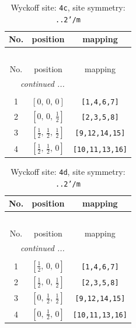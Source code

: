 \documentclass[fleqn,8pt]{jsarticle}
\begin{document}
\renewcommand{\arraystretch}{1.2}
\begin{longtable}{ccc}
\caption{Wyckoff site: {\tt 4c}, site symmetry: {\tt ..2'/m}}
 \\
 \hline \hline
No. & position & mapping \\ \hline \endfirsthead

\multicolumn{2}{l}{\tablename\ \thetable{}} \\
 \hline \hline
No. & position & mapping \\ \hline \endhead

 \hline \hline
\multicolumn{2}{r}{\footnotesize\it continued ...} \\ \endfoot

 \hline \hline
\multicolumn{2}{r}{} \\ \endlastfoot

1 & $\left[ 0,\, 0,\, 0 \right]$ & {\tt [1,4,6,7]} \\ \hline
2 & $\left[ 0,\, 0,\, \frac{1}{2} \right]$ & {\tt [2,3,5,8]} \\ \hline
3 & $\left[ \frac{1}{2},\, \frac{1}{2},\, \frac{1}{2} \right]$ & {\tt [9,12,14,15]} \\ \hline
4 & $\left[ \frac{1}{2},\, \frac{1}{2},\, 0 \right]$ & {\tt [10,11,13,16]} \\
\end{longtable}
\renewcommand{\arraystretch}{1.2}
\begin{longtable}{ccc}
\caption{Wyckoff site: {\tt 4d}, site symmetry: {\tt ..2'/m}}
 \\
 \hline \hline
No. & position & mapping \\ \hline \endfirsthead

\multicolumn{2}{l}{\tablename\ \thetable{}} \\
 \hline \hline
No. & position & mapping \\ \hline \endhead

 \hline \hline
\multicolumn{2}{r}{\footnotesize\it continued ...} \\ \endfoot

 \hline \hline
\multicolumn{2}{r}{} \\ \endlastfoot

1 & $\left[ \frac{1}{2},\, 0,\, 0 \right]$ & {\tt [1,4,6,7]} \\ \hline
2 & $\left[ \frac{1}{2},\, 0,\, \frac{1}{2} \right]$ & {\tt [2,3,5,8]} \\ \hline
3 & $\left[ 0,\, \frac{1}{2},\, \frac{1}{2} \right]$ & {\tt [9,12,14,15]} \\ \hline
4 & $\left[ 0,\, \frac{1}{2},\, 0 \right]$ & {\tt [10,11,13,16]} \\
\end{longtable}
\end{document}
